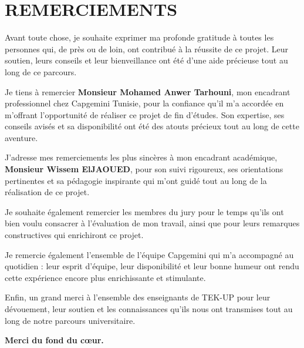 \chapter*{REMERCIEMENTS}

\vspace{0.5cm}

Avant toute chose, je souhaite exprimer ma profonde gratitude \`a toutes les personnes qui, de pr\`es ou de loin, ont contribu\'e \`a la r\'eussite de ce projet. Leur soutien, leurs conseils et leur bienveillance ont \'et\'e d'une aide pr\'ecieuse tout au long de ce parcours.

\vspace{0.3cm}

Je tiens \`a remercier \textbf{Monsieur Mohamed Anwer Tarhouni}, mon encadrant professionnel chez Capgemini Tunisie, pour la confiance qu'il m'a accord\'ee en m'offrant l'opportunit\'e de r\'ealiser ce projet de fin d'\'etudes. Son expertise, ses conseils avis\'es et sa disponibilit\'e ont \'et\'e des atouts pr\'ecieux tout au long de cette aventure.

\vspace{0.3cm}

J'adresse mes remerciements les plus sinc\`eres \`a mon encadrant acad\'emique, \textbf{Monsieur Wissem ElJAOUED}, pour son suivi rigoureux, ses orientations pertinentes et sa p\'edagogie inspirante qui m'ont guid\'e tout au long de la r\'ealisation de ce projet.

\vspace{0.3cm}

Je souhaite \'egalement remercier les membres du jury pour le temps qu'ils ont bien voulu consacrer \`a l'\'evaluation de mon travail, ainsi que pour leurs remarques constructives qui enrichiront ce projet.

\vspace{0.3cm}

Je remercie \'egalement l'ensemble de l'\'equipe Capgemini qui m'a accompagn\'e au quotidien : leur esprit d'\'equipe, leur disponibilit\'e et leur bonne humeur ont rendu cette exp\'erience encore plus enrichissante et stimulante.

\vspace{0.3cm}

Enfin, un grand merci \`a l'ensemble des enseignants de TEK-UP pour leur d\'evouement, leur soutien et les connaissances qu'ils nous ont transmises tout au long de notre parcours universitaire.

\vspace{1cm}
\begin{flushright}
  \textbf{Merci du fond du c\oe ur.}
\end{flushright}
